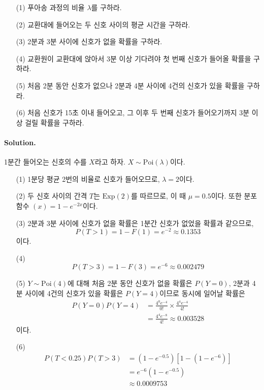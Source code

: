 \begin{itemize}
	\item [(1)] 푸아송 과정의 비율 $\lambda$를 구하라.
	\item [(2)] 교환대에 들어오는 두 신호 사이의 평균 시간을 구하라.
	\item [(3)] 2분과 3분 사이에 신호가 없을 확률을 구하라.
	\item [(4)] 교환원이 교환대에 앉아서 3분 이상 기다려야 첫 번째 신호가 들어올 확률을 구하라.
	\item [(5)] 처음 2분 동안 신호가 없으나 2분과 4분 사이에 4건의 신호가 있을 확률을 구하라.
	\item [(6)] 처음 신호가 15초 이내 들어오고, 그 이후 두 번째 신호가 들어오기까지 3분 이상 걸릴 확률을 구하라.
\end{itemize}

\paragraph{Solution.} 1분간 들어오는 신호의 수를 $X$라고 하자. $X\sim \mathrm{Poi}\left(\lambda\right)$이다.

\begin{itemize}
	\item [(1)] 1분당 평균 2번의 비율로 신호가 들어오므로, $\lambda = 2$이다.
	\item [(2)] 두 신호 사이의 간격 $T$는 $\mathrm{Exp}\left(2\right)$를 따르므로, 이 때 $\mu = 0.5$이다.
	또한 분포함수 $\left(x\right) = 1 - e^{-2x}$이다.
	\item [(3)] {
		2분과 3분 사이에 신호가 없을 확률은 1분간 신호가 없었을 확률과 같으므로,
		\[P\left(T > 1\right) = 1 - F\left(1\right) = e^{-2} \approx 0.1353\]이다.
	}
	\item [(4)] {
		\[P\left(T > 3\right) = 1 - F\left(3\right) = e^{-6} \approx 0.002479\]
	}
	\item [(5)] {
		$Y \sim \mathrm{Poi}\left(4\right)$에 대해 처음 2분 동안 신호가 없을 확률은 $P\left(Y=0\right)$, 2분과 4분 사이에 4건의 신호가 있을 확률은 
		$P\left(Y=4\right)$이므로 동시에 일어날 확률은
		\begin{align*}
			P\left(Y=0\right)P\left(Y=4\right) &= \frac{4^0 e^{-4}}{0!} \times \frac{4^4 e^{-4}}{4!} \\
			&= \frac{4^4 e^{-8}}{4!} \approx 0.003528
		\end{align*}
		이다.
	}
	\item [(6)] {
		\begin{align*}
			P\left(T<0.25\right) P\left(T>3\right) &= \left(1-e^{-0.5}\right)\left[1-\left(1-e^{-6}\right)\right] \\
			&= e^{-6}\left(1-e^{-0.5}\right) \\
			&\approx 0.0009753
		\end{align*}
	}
\end{itemize}

